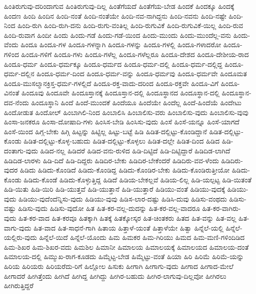 {ಹಿಂತಿರುಗುವು-ದರಿಂದಾಗುವ
ಹಿಂತಿರುಗುವು-ದಿಲ್ಲ
ಹಿಂತೆಗೆಯದೆ
ಹಿಂತೆಗೆಯ-ಬೇಡ
ಹಿಂದಕೆ
ಹಿಂದಕ್ಕೂ
ಹಿಂದಕ್ಕೆ
ಹಿಂದಣ
ಹಿಂದಿ
ಹಿಂದಿನ
ಹಿಂದಿ-ನಂತೆ
ಹಿಂದಿ-ನಂತೆಯೇ
ಹಿಂದಿ-ನವ-ನಾಗಿದ್ದನು
ಹಿಂದಿ-ನವನು
ಹಿಂದಿ-ನಷ್ಟೇ
ಹಿಂದಿ-ನಿಂದ
ಹಿಂದಿ-ರುಗಿ
ಹಿಂದಿ-ರುಗಿ-ದನು
ಹಿಂದಿ-ರುಗು-ವಂತಿಲ್ಲ
ಹಿಂದಿ-ರುಗುವಿಕೆ
ಹಿಂದಿ-ರುಗುವಿಕೆ-ಯಿಲ್ಲ
ಹಿಂದಿ-ರುವ
ಹಿಂದಿ-ರುವಾಗ
ಹಿಂದೀ
ಹಿಂದು
ಹಿಂದು-ಗಡೆ
ಹಿಂದು-ಗಡೆ-ಯಿಂದ
ಹಿಂದು-ಮುಂದು
ಹಿಂದು-ಮುಂದೆಲ್ಲ-ವನು
ಹಿಂದು-ವೆಂದು
ಹಿಂದೂ
ಹಿಂದೂ-ಗಳ
ಹಿಂದೂ-ಗಳನ್ನಾಗಿ
ಹಿಂದೂ-ಗಳನ್ನು
ಹಿಂದೂ-ಗಳಲ್ಲಿ
ಹಿಂದೂ-ಗಳಾದರೋ
ಹಿಂದೂ-ಗಳಿಂದ
ಹಿಂದೂ-ಗಳಿಗೆ
ಹಿಂದೂ-ಗಳು
ಹಿಂದೂ-ಗಳೆಲ್ಲ
ಹಿಂದೂ-ಗಳೆಲ್ಲರೂ
ಹಿಂದೂ-ದೇಶದ
ಹಿಂದೂ-ದೇಶೀಯ-ರಾದ
ಹಿಂದೂ-ಧರ್ಮ
ಹಿಂದೂ-ಧರ್ಮಕ್ಕೂ
ಹಿಂದೂ-ಧರ್ಮದ
ಹಿಂದೂ-ಧರ್ಮ-ದಲ್ಲಿ
ಹಿಂದೂ-ಧರ್ಮ-ದಲ್ಲಿದ್ದ
ಹಿಂದೂ-ಧರ್ಮ-ದಲ್ಲಿನ
ಹಿಂದೂ-ಧರ್ಮ-ದಿಂದ
ಹಿಂದೂ-ಧರ್ಮ-ವನ್ನು
ಹಿಂದೂ-ಧರ್ಮವು
ಹಿಂದೂ-ಧರ್ಮವೇ
ಹಿಂದೂಮತ
ಹಿಂದೂ-ಮುಸಲ್ಮಾನಕ್ರಿಸ್ತ-ಧರ್ಮ-ಗಳಲ್ಲಿದೆ
ಹಿಂದೂ-ರಕ್ತ-ವಾದು-ದರಿಂದ
ಹಿಂದೂ-ರಕ್ತವೇ
ಹಿಂದೂ-ವಿಗೆ
ಹಿಂದೂ-ವಿನಂತೆ
ಹಿಂದೂವು
ಹಿಂದೂವೇ
ಹಿಂದೂಸ್ತಾನಕ್ಕೆ
ಹಿಂದೂಸ್ತಾನ-ದಲ್ಲಿ
ಹಿಂದೂಸ್ಥಾನದ
ಹಿಂದೂಸ್ಥಾನ-ದಲ್ಲಿ
ಹಿಂದೂಸ್ಥಾನ-ದವ-ನೆಂದು
ಹಿಂದೂಸ್ಥಾನಿ
ಹಿಂದೆ
ಹಿಂದೆ-ಮುಂದಕೆ
ಹಿಂದೆಯೂ
ಹಿಂದೆಯೇ
ಹಿಂದೆಲ್ಲ
ಹಿಂದೆ-ಹಿಂದೆಯೆ
ಹಿಂದೇಟು
ಹಿಂದೋಡುತ
ಹಿಂದೋಲ್
ಹಿಂಬಾಗಿಲಿ-ನಿಂದ
ಹಿಂಬಾಲಿಸಿ
ಹಿಂಬಾಲಿಸು-ವರು
ಹಿಂಬಾಲಿಸು-ವುದು
ಹಿಂಬಾಲಿಸು-ವುವು
ಹಿಂಸಾ-ಜನಕರೂ
ಹಿಂಸಾ-ದೋಷಾದಿ-ಗಳು
ಹಿಂಸಿಸ-ಬೇಡಿ
ಹಿಂಸಿಸು-ವುದು
ಹಿಂಸೆ
ಹಿಂಸೆ-ಯನ್ನೂ
ಹಿಂಸೆ-ಯಾಗದೆ
ಹಿಂಸೆ-ಯಿಂದ
ಹಿಗ್ಗ-ಬೇಕು
ಹಿಗ್ಗಿ
ಹಿಟ್ಟನ್ನು
ಹಿಟ್ಟಿಲ್ಲ
ಹಿಟ್ಟು-ಬಟ್ಟೆ
ಹಿಡಿ
ಹಿಡಿತ-ದಲ್ಲಿಟ್ಟು-ಕೊಂಡಿದ್ದಾನೆ
ಹಿಡಿತ-ದಲ್ಲಿಟ್ಟು-ಕೊಂಡು
ಹಿಡಿತ-ದಲ್ಲಿಟ್ಟು-ಕೊಳ್ಳ-ಬಹುದು
ಹಿಡಿತ-ದಲ್ಲಿಟ್ಟು-ಕೊಳ್ಳಲು
ಹಿಡಿತ-ದಲ್ಲೇ
ಹಿಡಿತ-ದಿಂದ
ಹಿಡಿದ
ಹಿಡಿ-ದಂತಾಗು-ವುದು
ಹಿಡಿದ-ನಲ್ಲ
ಹಿಡಿದರೆ
ಹಿಡಿದ-ವನು-ರುಳಿದ
ಹಿಡಿ-ದಿಟ್ಟಿದೆ
ಹಿಡಿ-ದಿಟ್ಟಿದ್ದಾರೆ
ಹಿಡಿದಿಡ-ಲಾಗಿದೆ
ಹಿಡಿದಿಡ-ಲಾರಳು
ಹಿಡಿ-ದಿದೆ
ಹಿಡಿ-ದಿದ್ದರು
ಹಿಡಿದಿರ-ಬೇಕು
ಹಿಡಿದಿರ-ಬೇಕೆಂದರೆ
ಹಿಡಿದಿರು-ವವ-ಳೆಂದು
ಹಿಡಿದಿರು-ವುದರ
ಹಿಡಿದು
ಹಿಡಿದು-ಕೊಂಡಿದೆ
ಹಿಡಿದು-ಕೊಂಡಿದ್ದ
ಹಿಡಿದು-ಕೊಂಡಿರ-ಬೇಕು
ಹಿಡಿದು-ಕೊಂಡಿರುತ್ತೀಯೋ
ಹಿಡಿದು-ಕೊಂಡು
ಹಿಡಿದು-ಕೊಂಡೆ
ಹಿಡಿದು-ಕೊಳ್ಳುತ್ತಿದ್ದ
ಹಿಡಿದೆ
ಹಿಡಿಯ-ಬೇಕಲ್ಲವೆ
ಹಿಡಿಯ-ಲಿಲ್ಲ
ಹಿಡಿ-ಯಲ್ಪಟ್ಟ
ಹಿಡಿ-ಯಿತಂತೆ
ಹಿಡಿ-ಯಿತು
ಹಿಡಿ-ಯಿರಿ
ಹಿಡಿ-ಯುತ್ತವೆ
ಹಿಡಿ-ಯುತ್ತಾನೆ
ಹಿಡಿ-ಯುತ್ತಾರೆ
ಹಿಡಿಯು-ವಂತೆ
ಹಿಡಿಯು-ವುದಕ್ಕೆ
ಹಿಡಿಯು-ವುದು
ಹಿಡಿಯು-ವುದೆಂದೆನ್ನಿಸು-ವುದು
ಹಿಡಿಯು-ವುವು
ಹಿಡಿಸ-ಲಾರ-ದಷ್ಟು
ಹಿಡಿಸಿ-ದುವು
ಹಿಡಿಸು-ವಂಥದು
ಹಿಡಿಸು-ವಷ್ಟು
ಹಿಡಿಸು-ವುದು
ಹಿಡಿಸು-ವುದೋ
ಹಿತ
ಹಿತ-ಕರ-ವಲ್ಲ-ದುದನ್ನು
ಹಿತ-ಕರ-ವಲ್ಲ-ವಾದರೂ
ಹಿತ-ಕರ-ವಾಗಿರು-ವುದು
ಹಿತ-ಕರ-ವಾದ
ಹಿತ-ಕರವೂ
ಹಿತಕ್ಕಾಗಿ
ಹಿತಕ್ಕೆ
ಹಿತಕ್ಕೋಸ್ಕರ
ಹಿತ-ಚಿಂತಕರು
ಹಿತದ
ಹಿತ-ವನ್ನು
ಹಿತ-ವಲ್ಲ
ಹಿತ-ವಾಗು-ವುದು
ಹಿತ-ವಾದ
ಹಿತ-ಸಾಧನೆ-ಗಾಗಿ
ಹಿತಾಯ
ಹಿತ್ತಾಳೆ-ಯಂತೆ
ಹಿತ್ತಾಳೆಯೇ
ಹಿತ್ವಾ
ಹಿನ್ನೆಲೆ-ಯಲ್ಲಿ
ಹಿನ್ನೆಲೆ-ಯಲ್ಲಿರು-ವುದು
ಹಿನ್ನೆಲೆ-ಯಿದೆ
ಹಿನ್ನೆಲೆ-ಯೊಂದು
ಹಿಮ
ಹಿಮಕರ
ಹಿಮ-ಗಿರಿಯು
ಹಿಮದ
ಹಿಮ-ಮಣಿ-ಗಳಿಂದಿಡಿದ
ಹಿಮ-ಶಿಖರ
ಹಿಮ-ಶಿಖರ-ವದು
ಹಿಮಶಿಲ
ಹಿಮಾನೀ
ಹಿಮಾಲಯ
ಹಿಮಾಲಯಕ್ಕೆ
ಹಿಮಾಲಯದ
ಹಿಮಾಲಯ-ದಂತೆ
ಹಿಮಾಲಯ-ದಲ್ಲಿ
ಹಿಮ್ಮುಖ-ರಾಗ-ಕೂಡದು
ಹಿಮ್ಮೆಟ್ಟ-ಬೇಡ
ಹಿಮ್ಮೆಟ್ಟು-ವಂತೆ
ಹಿಯಾ
ಹಿರಿ
ಹಿರಿಮೆ
ಹಿರಿಮೆ-ಯನ್ನು
ಹಿರಿಯ
ಹಿರಿಯರು
ಹಿರಿಯರೆದು-ರಿಗೆ
ಹಿಲ್ಲೋಲ
ಹಿಸುಕು
ಹೀಗಾಗಿ
ಹೀಗಾಗು-ವುದು
ಹೀಗಾದ
ಹೀಗಾದ-ಮೇಲೆ
ಹೀಗಾದರೆ
ಹೀಗಿತ್ತೆಂದು
ಹೀಗಿದೆ
ಹೀಗಿದ್ದ
ಹೀಗಿದ್ದು
ಹೀಗಿರ-ಬಹುದು
ಹೀಗಿರ-ಲಾಗುವು-ದಿಲ್ಲವೋ
ಹೀಗಿರಲು
ಹೀಗಿರುತ್ತಿದ್ದರೆ
}
